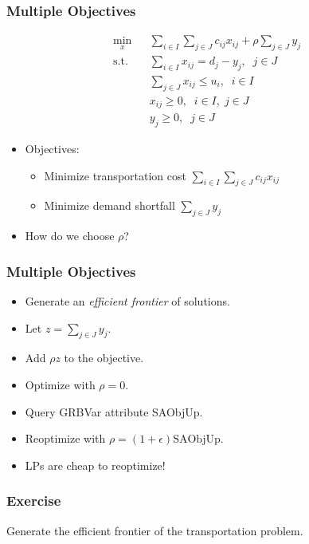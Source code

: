 \documentclass[12pt,handout]{beamer}
\begin{document}
\begin{frame}
\frametitle{Multiple Objectives}
\begin{eqnarray}
\min_{x} && \sum_{i \in I} \sum_{j \in J} c_{ij} x_{ij} + \rho \sum_{j \in J} y_j \nonumber \\
\mbox{s.t.} && \sum_{i \in I} x_{ij} = d_j - y_j,\;\;j \in J \nonumber \\
&& \sum_{j \in J} x_{ij} \le u_i,\;\;i \in I \nonumber \\
&& x_{ij} \ge 0, \;\;i \in I,\;j \in J \nonumber \\
&& y_j \ge 0,\;\;j \in J \nonumber
\end{eqnarray}
\begin{itemize}
\item Objectives:
    \begin{itemize}
    \item Minimize transportation cost $\sum_{i \in I} \sum_{j \in J} c_{ij} x_{ij}$
    \item Minimize demand shortfall $\sum_{j \in J} y_j$
    \end{itemize}
\item How do we choose $\rho$?
\end{itemize}
\end{frame}

\begin{frame}
\frametitle{Multiple Objectives}
\begin{itemize}
\item Generate an {\em efficient frontier} of solutions.
\item Let $z = \sum_{j \in J} y_j$.
\item Add $\rho z$ to the objective.
\item Optimize with $\rho = 0$.
\item Query GRBVar attribute SAObjUp.
\item Reoptimize with $\rho = (1+\epsilon)\mbox{SAObjUp}$.
\item LPs are cheap to reoptimize!
\end{itemize}
\end{frame}

\begin{frame}
\frametitle{Exercise}
Generate the efficient frontier of the transportation problem.
\end{frame}
\end{document}
